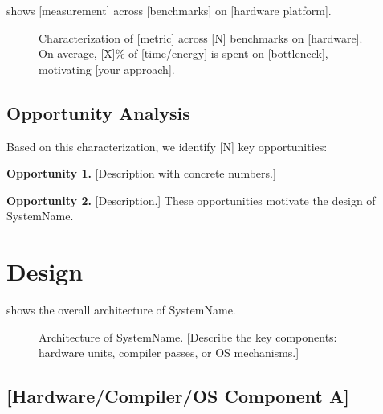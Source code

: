 \documentclass[sigplan,10pt]{acmart}
\newcommand{\system}{SystemName\xspace}
\newcommand{\para}[1]{\smallskip\noindent\textbf{#1.}}
\begin{document}
 shows [measurement] across [benchmarks] on
[hardware platform].

\begin{figure}[t]
  \centering
  \caption{Characterization of [metric] across [N] benchmarks on
    [hardware]. On average, [X]\% of [time/energy] is spent on
    [bottleneck], motivating [your approach].}
  \label{fig:motivation}
\end{figure}

\subsection{Opportunity Analysis}

Based on this characterization, we identify [N] key opportunities:

\para{Opportunity 1} [Description with concrete numbers.]

\para{Opportunity 2} [Description.] These opportunities motivate
the design of \system.

\section{Design}
\label{sec:design}

 shows the overall architecture of \system.

\begin{figure}[t]
  \centering
  \caption{Architecture of \system. [Describe the key components:
    hardware units, compiler passes, or OS mechanisms.]}
  \label{fig:architecture}
\end{figure}

\subsection{[Hardware/Compiler/OS Component A]}
\end{document}
